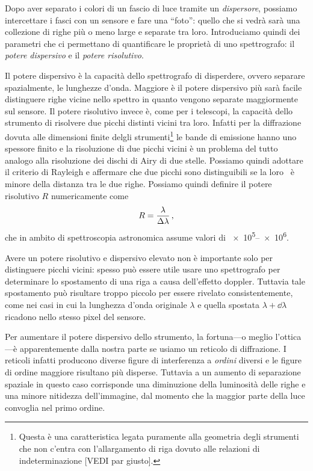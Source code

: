     Dopo aver separato i colori di un fascio di luce tramite un \emph{dispersore}, possiamo intercettare i fasci con un sensore e fare una ``foto'': quello che si vedrà sarà una collezione di righe più o meno large e separate tra loro. Introduciamo quindi dei parametri che ci permettano di quantificare le proprietà di uno spettrografo: il \emph{potere dispersivo} e il \emph{potere risolutivo}.
    
    Il potere dispersivo è la capacità dello spettrografo di disperdere, ovvero separare spazialmente, le lunghezze d'onda. Maggiore è il potere dispersivo più sarà facile distinguere righe vicine nello spettro in quanto vengono separate maggiormente sul sensore. Il potere risolutivo invece è, come per i telescopi, la capacità dello strumento di risolvere due picchi distinti vicini tra loro. Infatti per la diffrazione dovuta alle dimensioni finite delgli strumenti\footnote{Questa è una caratteristica legata puramente alla geometria degli strumenti che non c'entra con l'allargamento di riga dovuto alle relazioni di indeterminazione [VEDI par giusto].} le bande di emissione hanno uno spessore finito e la risoluzione di due picchi vicini è un problema del tutto analogo alla risoluzione dei dischi di Airy di due stelle. Possiamo quindi adottare il criterio di Rayleigh e affermare che due picchi sono distinguibili se la loro \FWHM\ è minore della distanza tra le due righe. Possiamo quindi definire il potere risolutivo $R$ numericamente come
    \begin{equation}
        R = \frac{\lambda}{\Delta\lambda}
        \,,
    \end{equation}
    che in ambito di spettroscopia astronomica assume valori di \num{e5}--\num{e6}.

    Avere un potere risolutivo e dispersivo elevato non è importante solo per distinguere picchi vicini: spesso può essere utile usare uno spettrografo per determinare lo spostamento di una riga a causa dell'effetto doppler. Tuttavia tale spostamento può risultare troppo piccolo per essere rivelato consistentemente, come nei casi in cui la lunghezza d'onda originale $\lambda$ e quella spostata $\lambda + \dd{\lambda}$ ricadono nello stesso pixel del sensore.

    Per aumentare il potere dispersivo dello strumento, la fortuna---o meglio l'ottica---è apparentemente dalla nostra parte se usiamo un reticolo di diffrazione. I reticoli infatti producono diverse figure di interferenza a \emph{ordini} diversi e le figure di ordine maggiore risultano più disperse. Tuttavia a un aumento di separazione spaziale in questo caso corrisponde una diminuzione della luminosità delle righe e una minore nitidezza dell'immagine, dal momento che la maggior parte della luce convoglia nel primo ordine.
    
